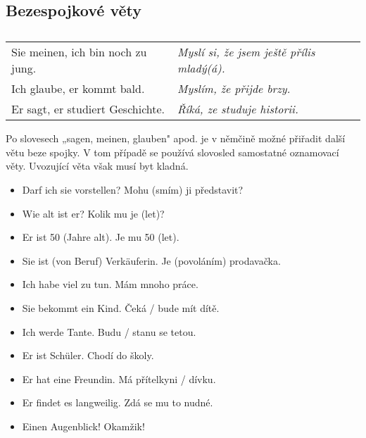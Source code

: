     \subsection*{Bezespojkové věty}
      \begin{table}[ht!]   %
        \centering
        \begin{tabular}{ll} 
          Sie meinen, ich bin noch zu jung. & \emph{Myslí si, že jsem ještě přílis mladý(á).} \\
          Ich glaube, er kommt bald.        & \emph{Myslím, že přijde brzy.}  \\
          Er sagt, er studiert Geschichte.  & \emph{Říká, ze studuje historii.}  \\
        \end{tabular}
        \caption*{ }
       \end{table} 
       Po slovesech „sagen, meinen, glauben" apod. je v němčině možné přiřadit další větu beze 
       spojky. V tom případě se používá slovosled samostatné oznamovací věty. Uvozující věta však 
       musí byt kladná.


  \begin{itemize}\addtolength{\itemsep}{-0.5\baselineskip} %
    \item Darf ich sie vorstellen?         Mohu (smím) ji představit?
    \item Wie alt ist er?                  Kolik mu je (let)?
    \item Er ist 50 (Jahre alt).           Je mu 50 (let).
    \item Sie ist (von Beruf) Verkäuferin. Je (povoláním) prodavačka.
    \item Ich habe viel zu tun.            Mám mnoho práce.
    \item Sie bekommt ein Kind.            Čeká / bude mít dítě.
    \item Ich werde Tante.                 Budu / stanu se tetou.
    \item Er ist Schüler.                  Chodí do školy.
    \item Er hat eine Freundin.            Má přítelkyni / dívku.  
    \item Er findet es langweilig.         Zdá se mu to nudné.
    \item Einen Augenblick!                Okamžik! 
  \end{itemize}